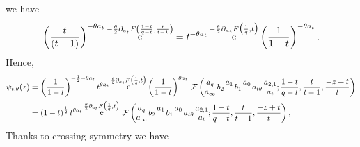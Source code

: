 \documentclass[11pt]{article}
\numberwithin{equation}{section}
\newcommand{\be}{\begin{equation}}
\newcommand{\ee}{\end{equation}}
\newcommand{\ba}{\begin{aligned}}
\newcommand{\ea}{\end{aligned}}
\newcommand{\ri}{{\rm i}}
\newcommand{\E}{{\mathrm e}}
\DeclareMathOperator{\re}{{\rm e}}
\begin{document}
we have
\begin{equation}  
\left(\frac{t}{(t-1)}\right)^{-\theta a_{t} }\re^{-\frac{\theta}{2}\partial_{a_t}F\left({1-t\over q-t},\frac{t}{t-1}\right)}=t^{-\theta a_t}\re^{-\frac{\theta}{2}\partial_{a_t}F\big({1\over q},t\big)}\left(\frac{1}{1-t}\right)^{-\theta a_t}.
\end{equation}
Hence, 
\be\label{connIt}  \ba  \psi_{t,\theta}(z)&=
\left(\frac{1}{1-t}\right)^{-\frac 1 2-\theta a_t}t^{\theta a_t}\re^{\frac{\theta}{2}\partial_{a_t}F\big({1\over q},t\big)}\left(\frac{1}{1-t}\right)^{\theta a_t}\,\mathcal{F}\left( \begin{matrix} a_{q} \\ a_{\infty} \end{matrix} \, b_2 \, \begin{matrix} a_1  \\ \, \end{matrix} \,b_1 \, \begin{matrix} a_0 \\ \, \end{matrix} \,a_{t\theta} \, \begin{matrix} a_{2,1} \\ a_t \end{matrix} ; \frac{1-t}{q-t}, \frac{t}{t-1}, \frac{-z+t}{t} \right)\\
&=
\left({1-t}\right)^{\frac 1 2}t^{\theta a_t}\re^{\frac{\theta}{2}\partial_{a_t}F\big({1\over q},t\big)}\,\mathcal{F}\left( \begin{matrix} a_{q} \\ a_{\infty} \end{matrix} \, b_2 \, \begin{matrix} a_1  \\ \, \end{matrix} \,b_1 \, \begin{matrix} a_0 \\ \, \end{matrix} \,a_{t\theta} \, \begin{matrix} a_{2,1} \\ a_t \end{matrix} ; \frac{1-t}{q-t}, \frac{t}{t-1}, \frac{-z+t}{t} \right),\ea\ee
Thanks to crossing symmetry we have
%
\end{document}
